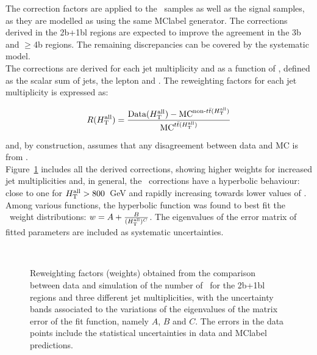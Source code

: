 The correction factors are applied to the \ttbar\ samples as well as the signal samples, as they are modelled as using the same \acrshort{MClabel} generator. The corrections derived in the 2b+1bl regions are expected to improve the agreement in the 3b and $\geq$4b regions. The remaining discrepancies can be covered by the systematic model.\\

The corrections are derived for each jet multiplicity and as a function of \HTall, defined as the scalar \pT sum of jets, the lepton and \MET. The reweighting factors for each jet multiplicity is expressed as:

\begin{equation}
    \label{tqX:RWeq}
    R(H_{\text{T}}^{\text{all}})=\frac{ \text{Data}(H_{\text{T}}^{\text{all}}) - \text{MC}^{\text{non-\ensuremath{t\bar{t}}}(H_{\text{T}}^{\text{all}})} }{\text{MC}^{\text{\ensuremath{t\bar{t}}}(H_{\text{T}}^{\text{all}})}}
\end{equation}

and, by construction, assumes that any disagreement between data and MC is from \ttbar.\\

Figure~\ref{tqX:RWfactors} includes all the derived corrections, showing higher weights for increased jet multiplicities and, in general, the \HTall\ corrections have a hyperbolic behaviour: close to one for $H_{\text{T}}^{\text{all}} > 800$~GeV and rapidly increasing towards lower values of \HTall. Among various functions, the hyperbolic function was found to best fit the \HTall\ weight distributions: $w=A+\frac{B}{(H_{\text{T}}^{\text{all}})^C}$. The eigenvalues of the error matrix of fitted parameters are included as systematic uncertainties.\\

\begin{figure}[htb]
    \RawFloats
    \begin{center}
     \\
    \caption{Reweighting factors (weights) obtained from the comparison between data and simulation of the number of \HTall\ for the 2b+1bl regions and three different jet multiplicities, with the uncertainty bands associated to the variations of the eigenvalues of the matrix error of the fit function, namely $A$, $B$ and $C$. The errors in the data points include the statistical uncertainties in data and \acrshort{MClabel} predictions.}
    \label{tqX:RWfactors}
\end{center}
\end{figure}

